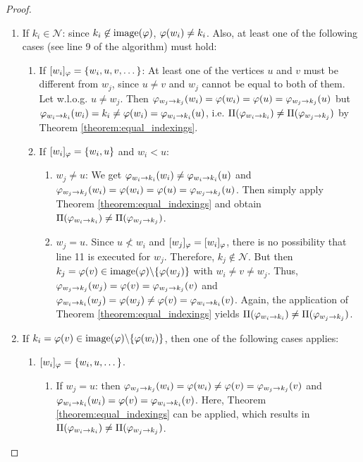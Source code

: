 \begin{proof}
\begin{enumerate}
        \begin{enumerate}
            \item If $k_i \in \mathcal{N}$: since $k_i \not\in \mathrm{image}(\varphi)$, $\varphi(w_i) \neq k_i$. Also, at least one of the following cases (see line 9 of the algorithm) must hold:
            \begin{enumerate}
                \item If $[w_i]_\varphi = \{ w_i, u, v, \dots \}$: At least one of the vertices $u$ and $v$ must be different from $w_j$, since $u \neq v$ and $w_j$ cannot be equal to both of them. Let w.l.o.g. $u \neq w_j$. Then $\varphi_{w_j\rightarrow k_j}(w_i) = \varphi(w_i) = \varphi(u) = \varphi_{w_j\rightarrow k_j}(u)$ but $\varphi_{w_i\rightarrow k_i}(w_i) = k_i \neq \varphi(w_i) = \varphi_{w_i\rightarrow k_i}(u)$, i.e. $\Pi(\varphi_{w_i\rightarrow k_i}) \neq \Pi(\varphi_{w_j\rightarrow k_j})$ by Theorem \ref{theorem:equal_indexings}.
                \item If $[w_i]_\varphi = \{w_i, u \}$ and $w_i < u$: 
                \begin{enumerate}
                    \item $w_j \neq u$: We get $\varphi_{w_i\rightarrow k_i}(w_i) \neq \varphi_{w_i\rightarrow k_i}(u)$ and $\varphi_{w_j\rightarrow k_j}(w_i) = \varphi(w_i) = \varphi(u) = \varphi_{w_j\rightarrow k_j}(u)$. Then simply apply Theorem \ref{theorem:equal_indexings} and obtain $\Pi(\varphi_{w_i\rightarrow k_i}) \neq \Pi(\varphi_{w_j\rightarrow k_j})$.
                    \item $w_j = u$. Since $u \not< w_i$ and $[w_j]_\varphi = [w_i]_\varphi$, there is no possibility that line 11 is executed for $w_j$. Therefore, $k_j \not\in \mathcal{N}$. But then $k_j= \varphi(v) \in \mathrm{image}(\varphi)\backslash \{ \varphi(w_j) \}$ with $w_i \neq v \neq w_j$. Thus, $\varphi_{w_j\rightarrow k_j}(w_j) = \varphi(v)=\varphi_{w_j\rightarrow k_j}(v)$ and $\varphi_{w_i\rightarrow k_i}(w_j) = \varphi(w_j) \neq \varphi(v) = \varphi_{w_i\rightarrow k_i}(v)$. Again, the application of Theorem \ref{theorem:equal_indexings} yields $\Pi(\varphi_{w_i\rightarrow k_i}) \neq \Pi(\varphi_{w_j\rightarrow k_j})$.
                \end{enumerate}
            \end{enumerate}
            \item If $k_i = \varphi(v) \in \mathrm{image}(\varphi)\backslash \{ \varphi(w_i) \}$, then one of the following cases applies:
            \begin{enumerate}
                \item $[w_i]_\varphi = \{w_i,u,\dots\}$. 
                \begin{enumerate}
                    \item If $w_j = u$: then $\varphi_{w_j\rightarrow k_j}(w_i) = \varphi(w_i) \neq \varphi(v) = \varphi_{w_j\rightarrow k_j}(v)$ and $\varphi_{w_i\rightarrow k_i}(w_i) = \varphi(v) = \varphi_{w_i\rightarrow k_i}(v)$. Here, Theorem \ref{theorem:equal_indexings} can be applied, which results in $\Pi(\varphi_{w_i\rightarrow k_i}) \neq \Pi(\varphi_{w_j\rightarrow k_j})$.

\end{enumerate}
\end{enumerate}
\end{enumerate}
\end{enumerate}
\end{proof}
